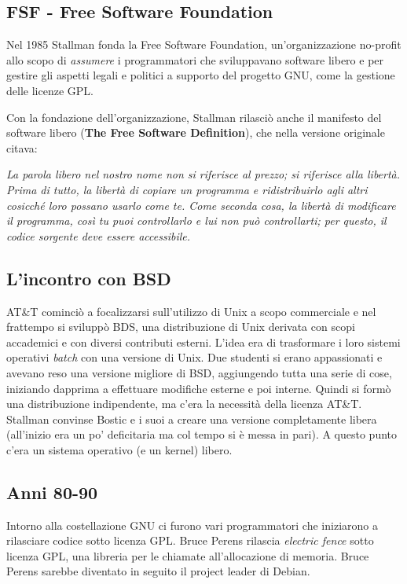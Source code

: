 \subsection{FSF - Free Software Foundation}

Nel 1985 Stallman fonda la Free Software Foundation, un'organizzazione no-profit allo scopo di \textit{assumere} i programmatori che sviluppavano software libero e per gestire gli aspetti legali e politici a supporto del progetto GNU, come la gestione delle licenze GPL.

Con la fondazione dell'organizzazione, Stallman rilasciò anche il manifesto del software libero (\textbf{The Free Software Definition}), che nella versione originale citava:

\begin{center}
	\textit{La parola libero nel nostro nome non si riferisce al prezzo; si riferisce alla libertà. Prima di tutto, la libertà di copiare un programma e ridistribuirlo agli altri cosicché loro possano usarlo come te. Come seconda cosa, la libertà di modificare il programma, così tu puoi controllarlo e lui non può controllarti; per questo, il codice sorgente deve essere accessibile.}
\end{center}


\subsection{L'incontro con BSD}

AT\&T cominciò a focalizzarsi sull'utilizzo di Unix a scopo commerciale e nel frattempo si sviluppò BDS, una distribuzione di Unix derivata con scopi accademici e con diversi contributi esterni. L'idea era di trasformare i loro sistemi operativi \textit{batch} con una versione di Unix.
Due studenti si erano appassionati e avevano reso una versione migliore di BSD, aggiungendo tutta una serie di cose, iniziando dapprima a effettuare modifiche esterne e poi interne. Quindi si formò una distribuzione indipendente, ma c'era la necessità della licenza AT\&T. 
Stallman convinse Bostic e i suoi a creare una versione completamente libera (all'inizio era un po' deficitaria ma col tempo si è messa in pari). A questo punto c'era un sistema operativo (e un kernel) libero.

\subsection{Anni 80-90}

Intorno alla costellazione GNU ci furono vari programmatori che iniziarono a rilasciare codice sotto licenza GPL. Bruce Perens rilascia \textit{electric fence} sotto licenza GPL, una libreria per le chiamate all'allocazione di memoria. Bruce Perens sarebbe diventato in seguito il project leader di Debian.

